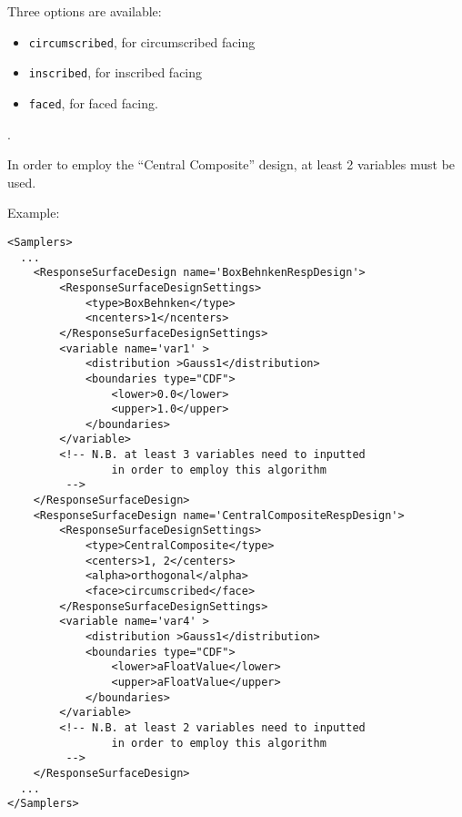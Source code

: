 \begin{itemize}
\begin{itemize}
\begin{itemize}
            Three options are available:
            \begin{itemize}
              \item \texttt{circumscribed}, for circumscribed facing
              \item \texttt{inscribed}, for inscribed facing
              \item \texttt{faced}, for faced facing.
            \end{itemize}
            .
         \end{itemize}
      \end{itemize}
      \nb In order to employ the ``Central Composite'' design, at least 2
      variables must be used.
    \end{itemize}



Example:
\begin{lstlisting}[style=XML,morekeywords={}]
<Samplers>
  ...
    <ResponseSurfaceDesign name='BoxBehnkenRespDesign'>
        <ResponseSurfaceDesignSettings>
            <type>BoxBehnken</type>
            <ncenters>1</ncenters>
        </ResponseSurfaceDesignSettings>
        <variable name='var1' >
            <distribution >Gauss1</distribution>
            <boundaries type="CDF">
                <lower>0.0</lower>
                <upper>1.0</upper>
            </boundaries>
        </variable>
        <!-- N.B. at least 3 variables need to inputted 
                in order to employ this algorithm
         -->
    </ResponseSurfaceDesign>
    <ResponseSurfaceDesign name='CentralCompositeRespDesign'>
        <ResponseSurfaceDesignSettings>
            <type>CentralComposite</type>
            <centers>1, 2</centers>
            <alpha>orthogonal</alpha>
            <face>circumscribed</face>
        </ResponseSurfaceDesignSettings>
        <variable name='var4' >
            <distribution >Gauss1</distribution>
            <boundaries type="CDF">
                <lower>aFloatValue</lower>
                <upper>aFloatValue</upper>
            </boundaries>
        </variable>
        <!-- N.B. at least 2 variables need to inputted 
                in order to employ this algorithm
         -->        
    </ResponseSurfaceDesign>
  ...
</Samplers>
\end{lstlisting}

